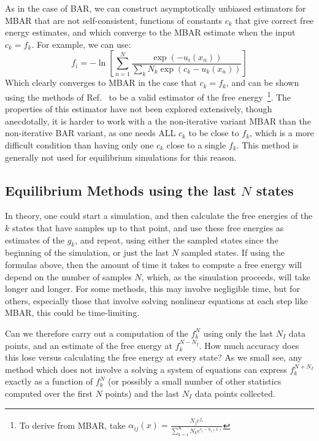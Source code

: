 \documentclass[superscriptaddress,showkeys, nofootinbib, pre, aps]{revtex4-1}
\begin{document}
As in the case of BAR, we can construct asymptotically unbiased
estimators for MBAR that are not self-consistent, functions of constants $c_k$ that give correct free energy estimates, and which
converge to the MBAR estimate when the input $c_k=f_k$.  For example, we can use:
\[
f_i = -\ln \left[\sum_{n=1}^N \frac{\exp(-u_i(x_n))}{\sum_k N_k \exp(c_k-u_k(x_n))}\right]
\label{eq:unoptimizedMBAR}
\]
Which clearly converges to MBAR in the case that $c_k=f_k$, and can be
shown using the methods of Ref.~\cite{shirts-chodera:jcp:2008:mbar} to be a valid
estimator of the free energy~\footnote{To derive from MBAR, take
  $\alpha_{ij}(x)=\frac{N_j e^{f_i}}{\sum_{k=1}^K N_k
    e^{c_i-u_i(x)}}$}. The properties of this estimator have not been
explored extensively, though anecdotally, it is harder to work with a the non-iterative variant MBAR
than the non-iterative BAR variant, as one needs ALL $c_k$ to be close
to $f_k$, which is a more difficult condition than having only one
$c_k$ close to a single $f_k$. This method is generally not used for equilibrium simulations for this reason.
 
\subsection{\label{sec:equilibrium_methods}Equilibrium Methods using the last $N$ states}

In theory, one could start a simulation, and then calculate the free energies of the $k$ states that have samples up to that point, and use these free energies as estimates of the $g_k$, and repeat, using either the sampled states since the beginning of the simulation, or just the last $N$ sampled states.
If using the formulas above, then the amount of time it takes to compute a free energy will depend on the number of samples $N$, which, as the simulation proceeds, will take longer and longer.  For some methods, this may involve negligible time, but for others, especially those that involve solving nonlinear equations at each step like MBAR, this could be time-limiting.

Can we therefore carry out a computation of the $f_k^N$ using only the last $N_I$ data points, and an estimate of the free energy at $f_k^{N-N_I}$.  How much accuracy does this lose versus calculating the free energy at every state? As we small see, any method which does not involve a solving a system of equations can express $f_k^{N+N_I}$ exactly as a function of $f_k^{N}$ (or possibly a small number of other statistics computed over the first $N$ points) and the last $N_I$ data points collected.
\end{document}
